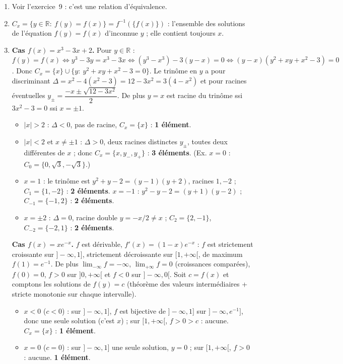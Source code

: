 \documentclass[11pt,a4paper]{article}
\newcommand{\R}{\mathbb{R}}\newcommand{\N}{\mathbb{N}}\newcommand{\Z}{\mathbb{Z}}
\begin{document}
	\begin{corrige}
		\begin{enumerate}
			\item Voir l'exercice~9 : c'est une relation d'équivalence.
			\item $C_x=\{y\in\R:\ f(y)=f(x)\}=f^{-1}(\{f(x)\})$ : l'ensemble des solutions de l'équation $f(y)=f(x)$ d'inconnue $y$ ; elle contient toujours $x$.
			\item \textbf{Cas $f(x)=x^3-3x+2$.} Pour $y\in\R$ : $f(y)=f(x)\iff y^3-3y=x^3-3x\iff (y^3-x^3)-3(y-x)=0\iff(y-x)(y^2+xy+x^2-3)=0$. Donc $C_x=\{x\}\cup\{y:\ y^2+xy+x^2-3=0\}$. Le trinôme en $y$ a pour discriminant $\Delta=x^2-4(x^2-3)=12-3x^2=3(4-x^2)$ et pour racines éventuelles $y_\pm=\dfrac{-x\pm\sqrt{12-3x^2}}2$. De plus $y=x$ est racine du trinôme ssi $3x^2-3=0$ ssi $x=\pm1$.
			\begin{itemize}
				\item $|x|>2$ : $\Delta<0$, pas de racine, $C_x=\{x\}$ : \textbf{1 élément}.
				\item $|x|<2$ et $x\neq\pm1$ : $\Delta>0$, deux racines distinctes $y_\pm$, toutes deux différentes de $x$ ; donc $C_x=\{x,y_-,y_+\}$ : \textbf{3 éléments}. (Ex. $x=0$ : $C_0=\{0,\sqrt3,-\sqrt3\}$.)
				\item $x=1$ : le trinôme est $y^2+y-2=(y-1)(y+2)$, racines $1,-2$ ; $C_1=\{1,-2\}$ : \textbf{2 éléments}. $x=-1$ : $y^2-y-2=(y+1)(y-2)$ ; $C_{-1}=\{-1,2\}$ : \textbf{2 éléments}.
				\item $x=\pm2$ : $\Delta=0$, racine double $y=-x/2\neq x$ ; $C_2=\{2,-1\}$, $C_{-2}=\{-2,1\}$ : \textbf{2 éléments}.
			\end{itemize}
			\textbf{Cas $f(x)=xe^{-x}$.} $f$ est dérivable, $f'(x)=(1-x)e^{-x}$ : $f$ est strictement croissante sur $]-\infty,1]$, strictement décroissante sur $[1,+\infty[$, de maximum $f(1)=e^{-1}$. De plus $\lim_{-\infty}f=-\infty$, $\lim_{+\infty}f=0$ (croissances comparées), $f(0)=0$, $f>0$ sur $]0,+\infty[$ et $f<0$ sur $]-\infty,0[$. Soit $c=f(x)$ et comptons les solutions de $f(y)=c$ (théorème des valeurs intermédiaires + stricte monotonie sur chaque intervalle).
			\begin{itemize}
				\item $x<0$ ($c<0$) : sur $]-\infty,1]$, $f$ est bijective de $]-\infty,1]$ sur $]-\infty,e^{-1}]$, donc une seule solution (c'est $x$) ; sur $[1,+\infty[$, $f>0>c$ : aucune. $C_x=\{x\}$ : \textbf{1 élément}.
				\item $x=0$ ($c=0$) : sur $]-\infty,1]$ une seule solution, $y=0$ ; sur $[1,+\infty[$, $f>0$ : aucune. \textbf{1 élément}.

\end{itemize}
\end{enumerate}
\end{corrige}
\end{document}

